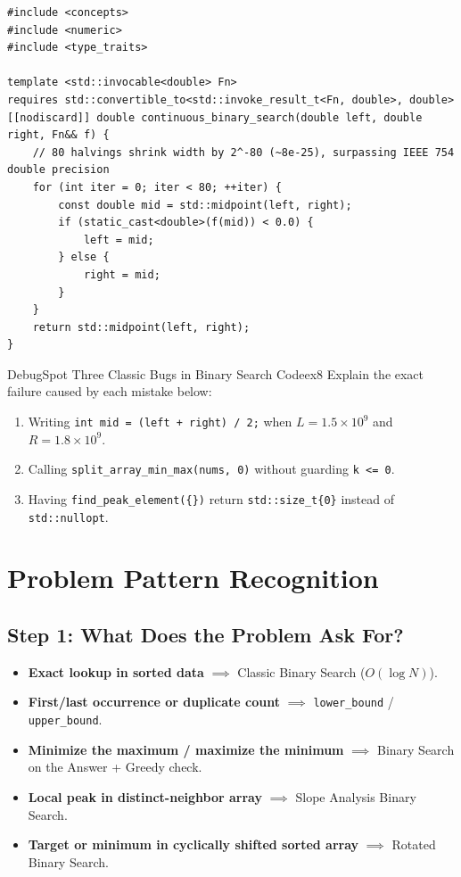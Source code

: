 \documentclass[11pt,a4paper]{article}
\theoremstyle{definition}
\begin{document}
\begin{lstlisting}[caption={Continuous floating-point binary search with std::invocable}]
#include <concepts>
#include <numeric>
#include <type_traits>

template <std::invocable<double> Fn>
requires std::convertible_to<std::invoke_result_t<Fn, double>, double>
[[nodiscard]] double continuous_binary_search(double left, double right, Fn&& f) {
    // 80 halvings shrink width by 2^-80 (~8e-25), surpassing IEEE 754 double precision
    for (int iter = 0; iter < 80; ++iter) {
        const double mid = std::midpoint(left, right);
        if (static_cast<double>(f(mid)) < 0.0) {
            left = mid;
        } else {
            right = mid;
        }
    }
    return std::midpoint(left, right);
}
\end{lstlisting}

\begin{tryitbox}{Debug}{Spot Three Classic Bugs in Binary Search Code}{ex8}
Explain the exact failure caused by each mistake below:
\begin{enumerate}
    \item Writing \texttt{int mid = (left + right) / 2;} when $L = 1.5 \times 10^9$ and $R = 1.8 \times 10^9$.
    \item Calling \texttt{split\_array\_min\_max(nums, 0)} without guarding \texttt{k <= 0}.
    \item Having \texttt{find\_peak\_element(\{\})} return \texttt{std::size\_t\{0\}} instead of \texttt{std::nullopt}.
\end{enumerate}
\end{tryitbox}

\section{Problem Pattern Recognition}

\subsection*{Step 1: What Does the Problem Ask For?}
\begin{itemize}
    \item \textbf{Exact lookup in sorted data} $\implies$ Classic Binary Search ($O(\log N)$).
    \item \textbf{First/last occurrence or duplicate count} $\implies$ \texttt{lower\_bound} / \texttt{upper\_bound}.
    \item \textbf{Minimize the maximum / maximize the minimum} $\implies$ Binary Search on the Answer + Greedy check.
    \item \textbf{Local peak in distinct-neighbor array} $\implies$ Slope Analysis Binary Search.
    \item \textbf{Target or minimum in cyclically shifted sorted array} $\implies$ Rotated Binary Search.
\end{itemize}
\end{document}

